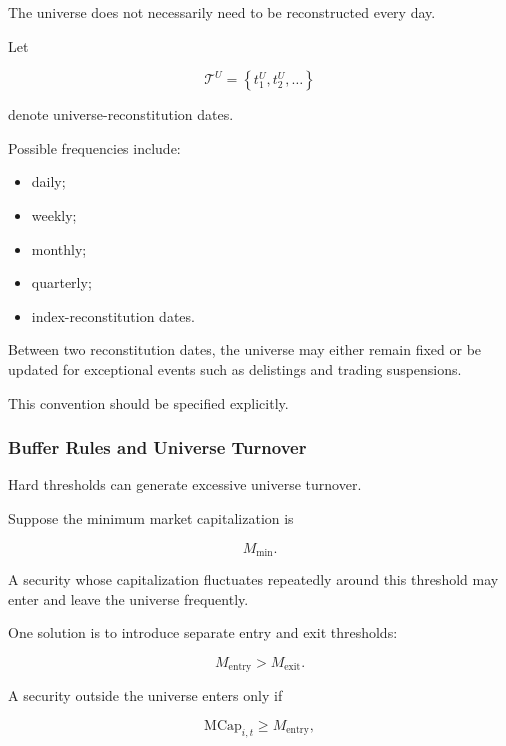\documentclass[11pt,a4paper]{article}
\begin{document}
The universe does not necessarily need to be reconstructed every day.

Let

\begin{equation}
\mathcal{T}^{U}
=
\left\{
t_1^{U},
t_2^{U},
\ldots
\right\}
\end{equation}

denote universe-reconstitution dates.

Possible frequencies include:

\begin{itemize}
    \item daily;
    \item weekly;
    \item monthly;
    \item quarterly;
    \item index-reconstitution dates.
\end{itemize}

Between two reconstitution dates, the universe may either remain fixed or be
updated for exceptional events such as delistings and trading suspensions.

This convention should be specified explicitly.


\subsubsection{Buffer Rules and Universe Turnover}

Hard thresholds can generate excessive universe turnover.

Suppose the minimum market capitalization is

\begin{equation}
M_{\min}.
\end{equation}

A security whose capitalization fluctuates repeatedly around this threshold may
enter and leave the universe frequently.

One solution is to introduce separate entry and exit thresholds:

\begin{equation}
M_{\mathrm{entry}}
>
M_{\mathrm{exit}}.
\end{equation}

A security outside the universe enters only if

\begin{equation}
\mathrm{MCap}_{i,t}
\geq
M_{\mathrm{entry}},
\end{equation}
\end{document}

